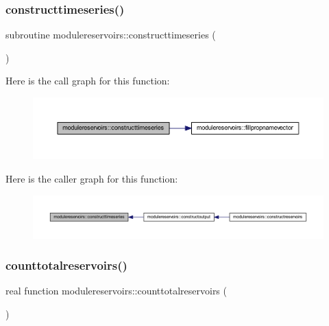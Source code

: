 \subsubsection{\texorpdfstring{constructtimeseries()}{constructtimeseries()}}
{\footnotesize\ttfamily subroutine modulereservoirs\+::constructtimeseries (\begin{DoxyParamCaption}{ }\end{DoxyParamCaption})\hspace{0.3cm}{\ttfamily [private]}}

Here is the call graph for this function\+:\nopagebreak
\begin{figure}[H]
\begin{center}
\leavevmode
\includegraphics[width=350pt]{namespacemodulereservoirs_a8cfdd387909b50145910c908f6e129f0_cgraph}
\end{center}
\end{figure}
Here is the caller graph for this function\+:\nopagebreak
\begin{figure}[H]
\begin{center}
\leavevmode
\includegraphics[width=350pt]{namespacemodulereservoirs_a8cfdd387909b50145910c908f6e129f0_icgraph}
\end{center}
\end{figure}
\mbox{\label{namespacemodulereservoirs_ac5bf14d3b0efa223e5c19855bb2380f2}} 
\subsubsection{\texorpdfstring{counttotalreservoirs()}{counttotalreservoirs()}}
{\footnotesize\ttfamily real function modulereservoirs\+::counttotalreservoirs (\begin{DoxyParamCaption}{ }\end{DoxyParamCaption})\hspace{0.3cm}{\ttfamily [private]}}

